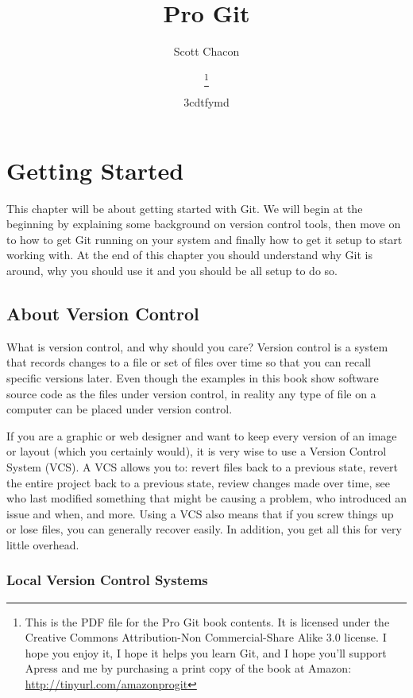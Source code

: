 \documentclass[a4paper]{book}
\title{Pro Git}
\author{Scott Chacon}
\title{\textbf{\savedtitle}}
\author{\textbf{\savedauthor}\thanks{This is the PDF file for the Pro Git book contents. It is licensed under the Creative Commons Attribution-Non Commercial-Share Alike 3.0 license. I hope you enjoy it, I hope it helps you learn Git, and I hope you'll support Apress and me by purchasing a print copy of the book at Amazon: \url{http://tinyurl.com/amazonprogit}}}
\date{\w3cdtfymd}
\makeatletter
\let\savedauthor=\@author
\let\savedtitle=\@title
\newcounter{tab}[chapter]
\newcommand{\chap}[1]{\newpage\thispagestyle{empty}\chapter{#1}\label{chap:\thechapter}}
\makeatother
\begin{document}
\frontmatter
\maketitle
\thispagestyle{empty}
\setcounter{tocdepth}{4}
\tableofcontents\newpage\thispagestyle{empty}

\mainmatter
\fancyhf{}
\fancyhead[LE]{{\small\leftmark}}
\fancyhead[RO]{{\small\rightmark}}
\fancyhead[RE,LO]{{\small\savedauthor\hspace*{1ex}\textbf{\savedtitle}}}
\fancyfoot[LE,RO]{\small\textbf\thepage}
\pagestyle{fancy}

\chap{Getting Started}\label{getting-started}

This chapter will be about getting started with Git. We will begin at the beginning by explaining some background on version control tools, then move on to how to get Git running on your system and finally how to get it setup to start working with. At the end of this chapter you should understand why Git is around, why you should use it and you should be all setup to do so.

\section{About Version Control}\label{about-version-control}

What is version control, and why should you care? Version control is a system that records changes to a file or set of files over time so that you can recall specific versions later. Even though the examples in this book show software source code as the files under version control, in reality any type of file on a computer can be placed under version control.

If you are a graphic or web designer and want to keep every version of an image or layout (which you certainly would), it is very wise to use a Version Control System (VCS). A VCS allows you to: revert files back to a previous state, revert the entire project back to a previous state, review changes made over time, see who last modified something that might be causing a problem, who introduced an issue and when, and more. Using a VCS also means that if you screw things up or lose files, you can generally recover easily. In addition, you get all this for very little overhead.

\subsection{Local Version Control Systems}\label{local-version-control-systems}
\end{document}
